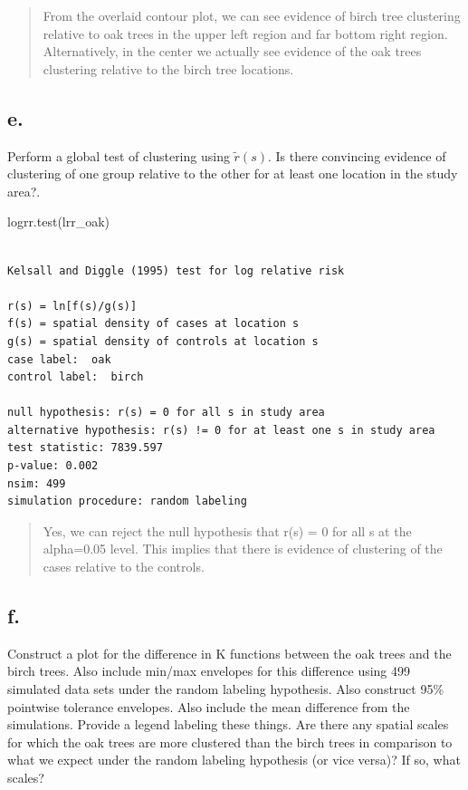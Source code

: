 \documentclass[
  letterpaper,
  DIV=11,
  numbers=noendperiod]{scrartcl}
\newenvironment{Shaded}{\begin{snugshade}}{\end{snugshade}}
\newcommand{\FunctionTok}[1]{\textcolor[rgb]{0.28,0.35,0.67}{#1}}
\newcommand{\NormalTok}[1]{\textcolor[rgb]{0.00,0.23,0.31}{#1}}
\begin{document}
\begin{quote}
From the overlaid contour plot, we can see evidence of birch tree
clustering relative to oak trees in the upper left region and far bottom
right region. Alternatively, in the center we actually see evidence of
the oak trees clustering relative to the birch tree locations.
\end{quote}

\hypertarget{e.}{%
\subsection{e.}\label{e.}}

Perform a global test of clustering using \(\tilde{r}(s)\). Is there
convincing evidence of clustering of one group relative to the other for
at least one location in the study area?.

\begin{Shaded}
\begin{Highlighting}[]
\FunctionTok{logrr.test}\NormalTok{(lrr\_oak)}
\end{Highlighting}
\end{Shaded}

\begin{verbatim}

Kelsall and Diggle (1995) test for log relative risk

r(s) = ln[f(s)/g(s)]
f(s) = spatial density of cases at location s
g(s) = spatial density of controls at location s
case label:  oak 
control label:  birch 

null hypothesis: r(s) = 0 for all s in study area
alternative hypothesis: r(s) != 0 for at least one s in study area
test statistic: 7839.597 
p-value: 0.002 
nsim: 499 
simulation procedure: random labeling
\end{verbatim}

\begin{quote}
Yes, we can reject the null hypothesis that r(s) = 0 for all s at the
alpha=0.05 level. This implies that there is evidence of clustering of
the cases relative to the controls.
\end{quote}

\hypertarget{f.}{%
\subsection{f.}\label{f.}}

Construct a plot for the difference in K functions between the oak trees
and the birch trees. Also include min/max envelopes for this difference
using 499 simulated data sets under the random labeling hypothesis. Also
construct 95\% pointwise tolerance envelopes. Also include the mean
difference from the simulations. Provide a legend labeling these things.
Are there any spatial scales for which the oak trees are more clustered
than the birch trees in comparison to what we expect under the random
labeling hypothesis (or vice versa)? If so, what scales?
\end{document}
